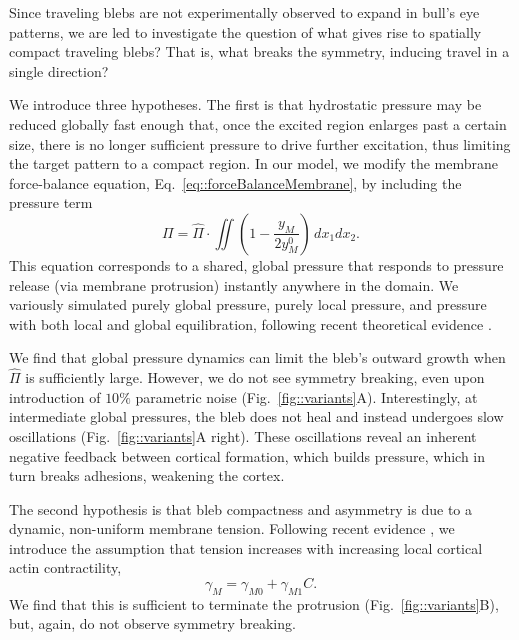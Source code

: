 Since traveling blebs are not experimentally observed to expand in bull's eye patterns, we are led to investigate the question of what gives rise to spatially compact traveling blebs? That is, what breaks the symmetry, inducing travel in a single direction? 

We introduce three hypotheses. The first is that hydrostatic pressure may be reduced globally fast enough that, once the excited region enlarges past a certain size, there is no longer sufficient pressure to drive further excitation, thus limiting the target pattern to a compact region. In our model, we modify the membrane force-balance equation, Eq.~\ref{eq::forceBalanceMembrane}, by including the pressure term
\begin{equation}
\Pi = \hat{\Pi}\cdot \iint  \left(1 - \frac{y_M}{2y_M^0}\right)\, dx_1 dx_2 \label{eq::globalPressure}.
\end{equation}
This equation corresponds to a shared, global pressure that responds to pressure release (via membrane protrusion) instantly anywhere in the domain. We variously simulated purely global pressure, purely local pressure, and pressure with both local and global equilibration, following recent theoretical evidence \cite{Strychalski:HizQv1Ti}. 

We find that global pressure dynamics can limit the bleb's outward growth when $\hat{\Pi}$ is sufficiently large. However, we do not see symmetry breaking, even upon introduction of $10\%$ parametric noise (Fig.~\ref{fig::variants}A). Interestingly, at intermediate global pressures, the bleb does not heal and instead undergoes slow oscillations (Fig.~\ref{fig::variants}A right). These oscillations reveal an inherent negative feedback between cortical formation, which builds pressure, which in turn breaks adhesions, weakening the cortex.

The second hypothesis is that bleb compactness and asymmetry is due to a dynamic, non-uniform membrane tension. Following recent evidence \cite{Peukes:2014fw}, we introduce the assumption that tension increases with increasing local cortical actin contractility,
\begin{equation}
\gamma_M = \gamma_{M0} + \gamma_{M1} C\label{eq::nonuniformTension}. 
\end{equation}
We find that this is sufficient to terminate the protrusion (Fig.~\ref{fig::variants}B), but, again, do not observe symmetry breaking.

